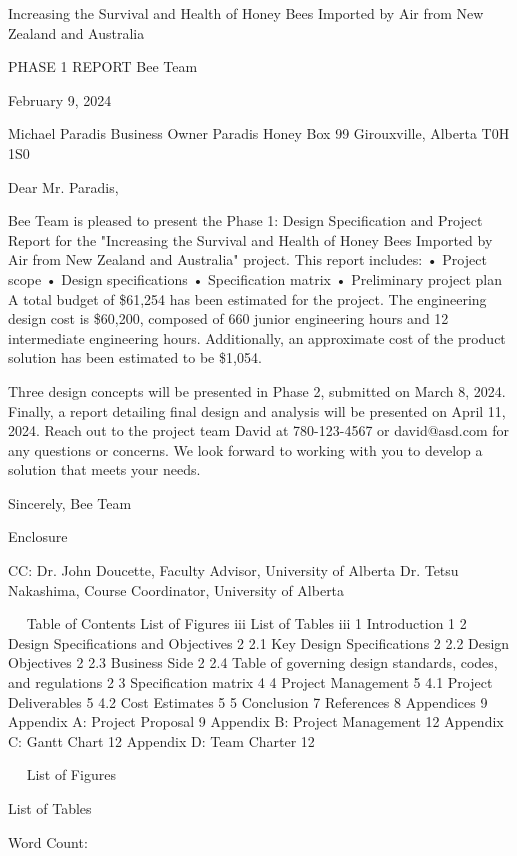 
 

Increasing the Survival and Health of Honey Bees Imported by Air from New Zealand and Australia

PHASE 1 REPORT
Bee Team



 
February 9, 2024

Michael Paradis
Business Owner
Paradis Honey
Box 99
Girouxville, Alberta T0H 1S0

Dear Mr. Paradis,

Bee Team is pleased to present the Phase 1: Design Specification and Project Report for the "Increasing the Survival and Health of Honey Bees Imported by Air from New Zealand and Australia" project. This report includes:
•	Project scope
•	Design specifications
•	Specification matrix
•	Preliminary project plan
A total budget of \$61,254 has been estimated for the project. The engineering design cost is \$60,200, composed of 660 junior engineering hours and 12 intermediate engineering hours. Additionally, an approximate cost of the product solution has been estimated to be \$1,054.

Three design concepts will be presented in Phase 2, submitted on March 8, 2024. Finally, a report detailing final design and analysis will be presented on April 11, 2024.
Reach out to the project team David at 780-123-4567 or david@asd.com for any questions or concerns. We look forward to working with you to develop a solution that meets your needs. 

Sincerely,
Bee Team


Enclosure

CC: Dr. John Doucette, Faculty Advisor, University of Alberta
Dr. Tetsu Nakashima, Course Coordinator, University of Alberta

 


 
Table of Contents
List of Figures	iii
List of Tables	iii
1	Introduction	1
2	Design Specifications and Objectives	2
2.1	Key Design Specifications	2
2.2	Design Objectives	2
2.3	Business Side	2
2.4	Table of governing design standards, codes, and regulations	2
3	Specification matrix	4
4	Project Management	5
4.1	Project Deliverables	5
4.2	Cost Estimates	5
5	Conclusion	7
References	8
Appendices	9
Appendix A: Project Proposal	9
Appendix B: Project Management	12
Appendix C: Gantt Chart	12
Appendix D: Team Charter	12



 
List of Figures

List of Tables

Word Count:




